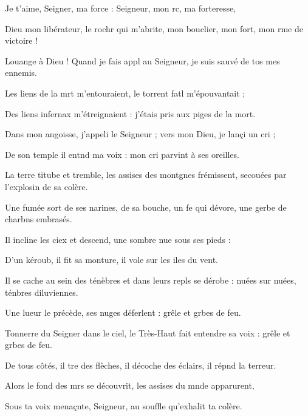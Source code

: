 \item Je t’aime, Seigner, ma force :\psstar{} Seigneur, mon rc, ma forteresse,
\item Dieu mon libérateur, le rochr qui m’abrite,\psstar{} mon bouclier, mon fort, mon rme de victoire !
\item Louange à Dieu !\pscross{} Quand je fais appl au Seigneur,\psstar{} je suis sauvé de tos mes ennemis.
\item Les liens de la mrt m’entouraient,\psstar{} le torrent fatl m’épouvantait ;
\item Des liens infernax m’étreignaient :\psstar{} j’étais pris aux piges de la mort.
\item Dans mon angoisse, j’appeli le Seigneur ;\psstar{} vers mon Dieu, je lançi un cri ; 
\item De son temple il entnd ma voix :\psstar{} mon cri parvint à ses oreilles.
\item La terre titube et tremble,\pscross{} les assises des montgnes frémissent,\psstar{} secouées par l’explosin de sa colère.
\item Une fumée sort de ses narines,\pscross{} de sa bouche, un fe qui dévore,\psstar{} une gerbe de charbns embrasés.
\item Il incline les ciex et descend,\psstar{} une sombre nue sous ses pieds :
\item D’un kéroub, il fit sa monture,\psstar{} il vole sur les iles du vent.
\item Il se cache au sein des ténèbres\pscross{} et dans leurs repls se dérobe :\psstar{} nuées sur nuées, ténbres diluviennes.
\item Une lueur le précède,\pscross{} ses nuges déferlent :\psstar{} grêle et grbes de feu.
\item Tonnerre du Seigner dans le ciel,\psstar{} le Très-Haut fait entendre sa voix : grêle et grbes de feu.
\item De tous côtés, il tre des flèches,\psstar{} il décoche des éclairs, il répnd la terreur.
\item Alors le fond des mrs se découvrit,\psstar{} les assises du mnde apparurent, 
\item Sous ta voix menaçnte, Seigneur,\psstar{} au souffle qu’exhalit ta colère.
